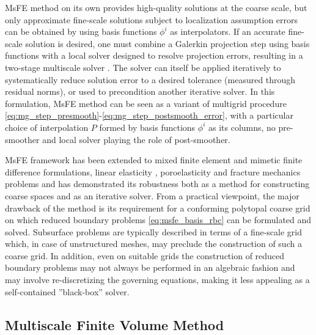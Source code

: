 MsFE method on its own provides high-quality solutions at the coarse scale, but only approximate fine-scale solutions subject to localization assumption errors can be obtained by using basis functions $\phi^i$ as interpolators.   If an accurate fine-scale solution is desired, one must combine a Galerkin projection step using basis functions with a local solver designed to resolve projection errors, resulting in a two-stage multiscale solver \cite{Zhou2012}.   The solver can itself be applied iteratively to systematically reduce solution error to a desired tolerance (measured through residual norms), or used to precondition another iterative solver.   In this formulation, MsFE method can be seen as a variant of multigrid procedure \eqref{eq:mg_step_presmooth}-\eqref{eq:mg_step_postsmooth_error}, with a particular choice of interpolation $P$ formed by basis functions $\phi^i$ as its columns, no pre-smoother and local solver playing the role of post-smoother.

MsFE framework has been extended to mixed finite element \cite{Chen2002} and mimetic finite difference \cite{Lipnikov2008} formulations, linear elasticity \cite{Buck2013,Castelletto2017}, poroelasticity \cite{Brown2016,Castelletto2019} and fracture mechanics \cite{Levonyan2019} problems and has demonstrated its robustness both as a method for constructing coarse spaces and as an iterative solver.   From a practical viewpoint, the major drawback of the method is its requirement for a conforming polytopal coarse grid on which reduced boundary problems \eqref{eq:msfe_basis_rbc} can be formulated and solved.   Subsurface problems are typically described in terms of a fine-scale grid which, in case of unstructured meshes, may preclude the construction of such a coarse grid.   In addition, even on suitable grids the construction of reduced boundary problems may not always be performed in an algebraic fashion and may involve re-discretizing the governing equations, making it less appealing as a self-contained ''black-box'' solver.

\subsection{Multiscale Finite Volume Method}
\label{subsec:related_work_msfv}

